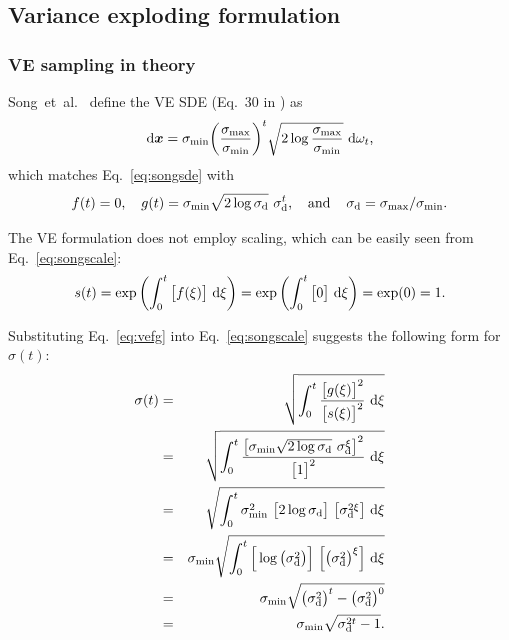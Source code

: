 \subsection{Variance exploding formulation}
\label{app:reframingve}

\subsubsection{VE sampling in theory}

Song~et~al.~\cite{Song2021sde} define the VE SDE (Eq.~30 in \cite{Song2021sde}) as
\begin{equation}
  \diff\xx = \smin \bigg( \frac{\smax}{\smin} \bigg)^t \sqrt{2 \log \frac{\smax}{\smin}} ~\diff \omega_t
  \text{,}
\end{equation}
which matches Eq.~\ref{eq:songsde} with
\begin{equation}
  \label{eq:vefg}
  f(t) = 0
  \text{,}\hspace{4mm}
  g(t) = \smin \sqrt{2\log\sdyn} ~\sdyn^t
  \text{,}\hspace{4mm}\text{and}\hspace{4mm}
  \sdyn = \smax / \smin
  \text{.}
\end{equation}

The VE formulation does not employ scaling, which can be easily seen from Eq.~\ref{eq:songscale}:
\begin{equation}
  s(t) = \exp\left( \int_0^t \big[ f(\xi) \big] ~\mathrm{d}\xi \right) = \exp\left( \int_0^t \big[ 0 \big] ~\mathrm{d}\xi \right) = \exp(0) = 1
  \text{.}
\end{equation}

Substituting Eq.~\ref{eq:vefg} into Eq.~\ref{eq:songscale} suggests the following form for $\sigma(t)$:
\begin{eqnarray}
  \sigma(t) &=& \sqrt{\int_0^t \frac{\big[ g(\xi) \big]^2}{\big[ s(\xi) \big]^2} ~\diff\xi} \\
  &=& \sqrt{\int_0^t \frac{\big[ \smin \sqrt{2\log\sdyn} ~\sdyn^\xi \big]^2}{\big[ 1 \big]^2} ~\diff\xi} \\
  &=& \sqrt{\int_0^t \smin^2 ~\big[ 2\log\sdyn \big] ~\big[ \sdyn^{2\xi} \big] ~\diff\xi} \\
  &=& \smin \sqrt{\int_0^t \Big[ \log \big( \sdyn^2 \big) \Big] ~\Big[ \big( \sdyn^2 \big)^\xi \Big] ~\diff\xi} \\
  &=& \smin \sqrt{\big( \sdyn^2 \big)^t - \big( \sdyn^2 \big)^0} \\
  &=& \smin \sqrt{\sdyn^{2t} - 1}
  \label{eq:fakevesigma}
  \text{.}
\end{eqnarray}

